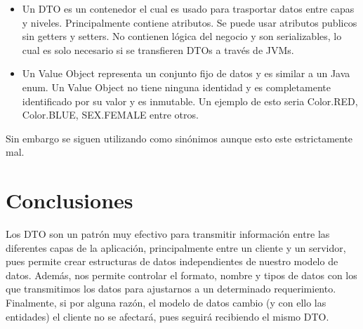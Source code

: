 \documentclass[a4paper,12pt]{article}
\begin{document}
\begin{itemize}
   \item Un DTO es un contenedor el cual es usado para trasportar datos entre 
capas y niveles. Principalmente contiene atributos. Se puede usar atributos 
publicos sin getters y setters. No contienen lógica del negocio y son 
serializables, lo cual es solo necesario si se transfieren DTOs a través de 
JVMs.
  \item Un Value Object representa un conjunto fijo de datos y es similar a un 
Java enum. Un Value Object no tiene ninguna identidad y es completamente 
identificado por su valor y es inmutable. Un ejemplo de esto seria Color.RED, 
Color.BLUE, SEX.FEMALE entre otros.
\end{itemize}

Sin embargo se siguen utilizando como sinónimos aunque esto este estrictamente 
mal.

\section{Conclusiones}
Los DTO son un patrón muy efectivo para transmitir información entre las 
diferentes capas de la aplicación, principalmente entre un cliente y un 
servidor, pues permite crear estructuras de datos independientes de nuestro 
modelo de datos. Además, nos permite controlar el formato, nombre y tipos de 
datos con los que transmitimos los datos para ajustarnos a un determinado 
requerimiento. Finalmente, si por alguna razón, el modelo de datos cambio (y 
con ello las entidades) el cliente no se afectará, pues seguirá recibiendo el 
mismo DTO.



\end{document}
